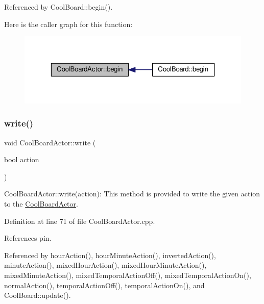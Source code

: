 Referenced by Cool\+Board\+::begin().

Here is the caller graph for this function\+:\nopagebreak
\begin{figure}[H]
\begin{center}
\leavevmode
\includegraphics[width=323pt]{dc/d69/class_cool_board_actor_a7f4422fd85a5510bc2cdfd68e109be5e_icgraph}
\end{center}
\end{figure}
\mbox{\label{class_cool_board_actor_a958786ff01ea1056ee72c72d439f86da}} 
\subsubsection{\texorpdfstring{write()}{write()}}
{\footnotesize\ttfamily void Cool\+Board\+Actor\+::write (\begin{DoxyParamCaption}\item[{bool}]{action }\end{DoxyParamCaption})}

Cool\+Board\+Actor\+::write(action)\+: This method is provided to write the given action to the \hyperlink{class_cool_board_actor}{Cool\+Board\+Actor}. 

Definition at line 71 of file Cool\+Board\+Actor.\+cpp.



References pin.



Referenced by hour\+Action(), hour\+Minute\+Action(), inverted\+Action(), minute\+Action(), mixed\+Hour\+Action(), mixed\+Hour\+Minute\+Action(), mixed\+Minute\+Action(), mixed\+Temporal\+Action\+Off(), mixed\+Temporal\+Action\+On(), normal\+Action(), temporal\+Action\+Off(), temporal\+Action\+On(), and Cool\+Board\+::update().


